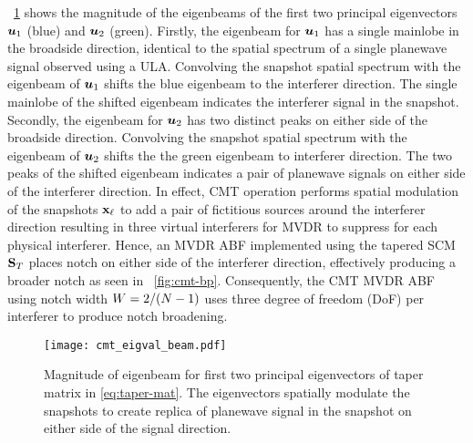 \figurename{}~\ref{fig:cmt-eigenbeam} shows the magnitude of the
eigenbeams of the first two principal eigenvectors $\boldsymbol{u}_1$
(blue) and $\boldsymbol{u}_2$ (green). Firstly, the eigenbeam for
$\boldsymbol{u}_1$ has a single mainlobe in the broadside direction,
identical to the spatial spectrum of a single planewave signal
observed using a ULA. Convolving the snapshot spatial spectrum with
the eigenbeam of $\boldsymbol{u}_1$ shifts the blue eigenbeam to the
interferer direction. The single mainlobe of the shifted eigenbeam
indicates the interferer signal in the snapshot. Secondly, the
eigenbeam for $\boldsymbol{u}_2$ has two distinct peaks on either side of
the broadside direction. Convolving the snapshot spatial spectrum with
the eigenbeam of $\boldsymbol{u}_2$ shifts the the green eigenbeam to
interferer direction. The two peaks of the shifted eigenbeam indicates
a pair of planewave signals on either side of the interferer
direction. In effect, CMT operation performs spatial modulation of the
snapshots ${\bf x}_{\ell}$ to add a pair of fictitious sources around
the interferer direction resulting in three virtual interferers for
MVDR to suppress for each physical interferer. Hence, an MVDR ABF
implemented using the tapered SCM ${\bf S}_{T}$ places notch on
either side of the interferer direction, effectively producing a
broader notch as seen in \figurename{}~\ref{fig:cmt-bp}. Consequently,
the CMT MVDR ABF using notch width $W = 2/(N-1)$ uses three degree
of freedom (DoF) per interferer to produce notch broadening.

\begin{figure}[!htb]
  \centering
  \texttt{[image: cmt\_eigval\_beam.pdf]}
  \caption[Magnitude of eigenbeam for first two principal eigenvectors
  of the sinc taper matrix]{Magnitude of eigenbeam for first two principal
    eigenvectors of taper matrix in \eqn{}\eqref{eq:taper-mat}. The
    eigenvectors spatially modulate the snapshots to create replica of
    planewave signal in the snapshot on either side of the signal
    direction.}
  \label{fig:cmt-eigenbeam}
\end{figure}

